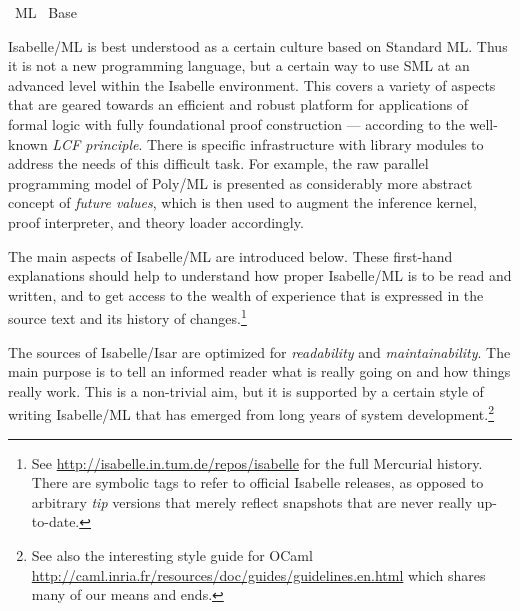 %
\begin{isabellebody}%
\def\isabellecontext{ML}%
%
\isadelimtheory
%
\endisadelimtheory
%
\isatagtheory
{}\isamarkupfalse%
\ {}ML{}\isanewline
{}\ Base\isanewline
{}%
\endisatagtheory
{\isafoldtheory}%
%
\isadelimtheory
%
\endisadelimtheory
%
\isamarkuptrue%
%
\begin{isamarkuptext}%
Isabelle/ML is best understood as a certain culture based on
  Standard ML.  Thus it is not a new programming language, but a
  certain way to use SML at an advanced level within the Isabelle
  environment.  This covers a variety of aspects that are geared
  towards an efficient and robust platform for applications of formal
  logic with fully foundational proof construction --- according to
  the well-known \emph{LCF principle}.  There is specific
  infrastructure with library modules to address the needs of this
  difficult task.  For example, the raw parallel programming model of
  Poly/ML is presented as considerably more abstract concept of
  \emph{future values}, which is then used to augment the inference
  kernel, proof interpreter, and theory loader accordingly.

  The main aspects of Isabelle/ML are introduced below.  These
  first-hand explanations should help to understand how proper
  Isabelle/ML is to be read and written, and to get access to the
  wealth of experience that is expressed in the source text and its
  history of changes.\footnote{See
  \url{http://isabelle.in.tum.de/repos/isabelle} for the full
  Mercurial history.  There are symbolic tags to refer to official
  Isabelle releases, as opposed to arbitrary \emph{tip} versions that
  merely reflect snapshots that are never really up-to-date.}%
\end{isamarkuptext}%
\isamarkuptrue%
%
\isamarkuptrue%
%
\begin{isamarkuptext}%
The sources of Isabelle/Isar are optimized for
  \emph{readability} and \emph{maintainability}.  The main purpose is
  to tell an informed reader what is really going on and how things
  really work.  This is a non-trivial aim, but it is supported by a
  certain style of writing Isabelle/ML that has emerged from long
  years of system development.\footnote{See also the interesting style
  guide for OCaml
  \url{http://caml.inria.fr/resources/doc/guides/guidelines.en.html}
  which shares many of our means and ends.}


\end{isamarkuptext}
\end{isabellebody}
